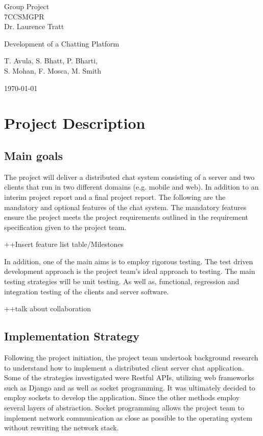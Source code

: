 \documentclass[11pt,a4paper]{article}
\begin{document}
\begin{center}
\large{Group Project\\7CCSMGPR} \\
\large{Dr. Laurence Tratt}

\bigskip

\Huge{Development of a Chatting Platform}

\bigskip

\Large{T. Avula, S. Bhatt, P. Bharti, \\S. Mohan, F. Mosca, M. Smith} \\

\bigskip

\large{\today}
\end{center}

\bigskip


\section{Project Description}
\subsection{Main goals}
The project will deliver a distributed chat system consisting of a server and two clients that run in two different domains (e.g. mobile and web). In addition to an interim project report and a final project report. The following are the mandatory and optional features of the chat system. The mandatory features ensure the project meets the project requirements outlined in the requirement specification given to the project team.

++Insert feature list table/Milestones


In addition, one of the main aims is to employ rigorous testing. The test driven development approach is the project team’s ideal approach to testing. The main testing strategies will be unit testing. As well as, functional, regression and integration testing of the clients and server software.

++talk about collaboration

\subsection{Implementation Strategy}
Following the project initiation, the project team undertook background research to understand how to implement a distributed client server chat application. Some of the strategies investigated were Restful APIs, utilizing web frameworks such as Django and as well as socket programming. It was ultimately decided to employ sockets to develop the application. Since the other methods employ several layers of abstraction. Socket programming allows the project team to implement network communication as close as possible to the operating system without rewriting the network stack.
\end{document}
